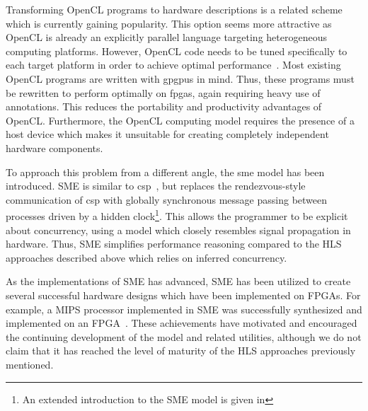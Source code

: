 Transforming OpenCL programs to hardware descriptions is a related scheme which
is currently gaining popularity. This option seems more attractive as OpenCL is
already an explicitly parallel language targeting heterogeneous computing
platforms. However, OpenCL code needs to be tuned specifically to each target
platform in order to achieve optimal performance~\cite{chen2012using}. Most
existing OpenCL programs are written with \glspl{gpgpu} in mind. Thus, these programs
must be rewritten to perform optimally on \glspl{fpga}, again requiring heavy use of
annotations. This reduces the portability and productivity advantages of OpenCL.
Furthermore, the OpenCL computing model requires the presence of a host device
which makes it unsuitable for creating completely independent hardware
components.

To approach this problem from a different angle, the \gls{sme}
model\cite{vinter2015bus,vinter2014synchronous} has been introduced. SME is
similar to \gls{csp}~\cite{csp}, but replaces the rendezvous-style communication
of \gls{csp} with globally synchronous message passing between processes driven
by a hidden clock\footnote{An extended introduction to the SME model is given in
  }.
This allows the programmer to be explicit about concurrency, using a model which
closely resembles signal propagation in hardware. Thus, SME simplifies
performance reasoning compared to the HLS approaches described above which
relies on inferred concurrency.

As the implementations of SME has advanced, SME has been utilized to create
several successful hardware designs which have been implemented on FPGAs. For
example, a MIPS processor implemented in SME was successfully synthesized and
implemented on an FPGA~\cite{johnsen2017thesis}. These achievements have
motivated and encouraged the continuing development of the model and related
utilities, although we do not claim that it has reached the level of maturity of
the HLS approaches previously mentioned.

